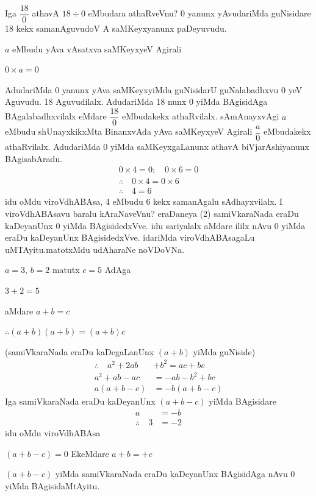 Iga $\dfrac{18}{0}$ athavA $18\div 0$ eMbudara athaRveVnu? {\rm 0} yanunx yAvudariMda guNisidare {\rm 18} kekx samanAguvudoV A saMKeyxyanunx paDeyuvudu.

 $a$ eMbudu yAva vAsatxva saMKeyxyeV Agirali
\begin{center}
$0\times a=0$
\end{center}
AdudariMda {\rm 0} yanunx yAva saMKeyxyiMda guNisidarU guNalabadhxvu {\rm 0} yeV Aguvudu. {\rm 18} Aguvudilalx. AdudariMda {\rm 18} nunx {\rm 0} yiMda BAgisidAga BAgalabadhxvilalx eMdare $\dfrac{18}{0}$ eMbudakekx athaRvilalx. sAmAnayxvAgi $a$ eMbudu shUnayxkikxMta BinanxvAda yAva saMKeyxyeV Agirali $\dfrac{a}{0}$ eMbudakekx athaRvilalx. AdudariMda {\rm 0} yiMda  saMKeyx\-gaLanunx athavA biVjarAshiyanunx BAgisabAradu.
\begin{gather*}
0\times 4=0; \quad 0\times 6=0\tag{\rm 1}\\
\therefore \quad 0\times 4=0\times 6 \quad \tag{\rm 2}\\
\therefore \quad 4=6 \quad \tag{\rm 3}  
\end{gather*}
idu oMdu viroVdhABAsa, {\rm 4} eMbudu {\rm 6} kekx samanAgalu sAdhayxvilalx.\break 
I viroVdhABAsavu baralu kAraNaveVnu? eraDaneya {\rm (2)} samiVkaraNada eraDu kaDeyanUnx {\rm 0} yiMda BAgisidedxVve. idu sariyalalx aMdare ililx nAvu {\rm 0} yiMda eraDu kaDeyanUnx BAgisidedxVve. idariMda viroVdhABAsagaLu uMTAyitu.\break matotxMdu udAharaNe noVDoVNa.
\begin{center}
$a=3$,  $b=2$ \quad matutx \quad $c=5$ \quad AdAga

$3+2=5$

aMdare \quad $a+b=c$

$\therefore (a+b)(a+b)=(a+b)c$
\end{center}
(samiVkaraNada eraDu kaDegaLanUnx $(a+b)$ yiMda guNiside)
\begin{align*}
\therefore \quad a^2+2ab&+b^2=ac+bc\\
a^2+ab-ac&=-ab-b^2+bc\\
a(a+b-c)&=-b(a+b-c)
\end{align*}
Iga samiVkaraNada eraDu kaDeyanUnx $(a+b-c)$ yiMda BAgisidare
\begin{align*}
a&=-b\\
\therefore \quad 3&=-2
\end{align*}
idu oMdu viroVdhABAsa

$(a+b-c)=0$ \quad EkeMdare \quad $a+b=+c$

$(a+b-c)$ yiMda samiVkaraNada eraDu kaDeyanUnx BAgisidAga nAvu {\rm 0} yiMda BAgisidaMtAyitu.

